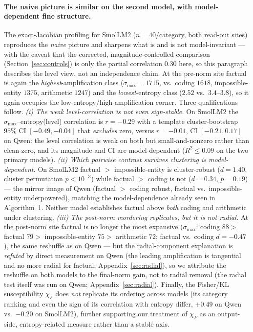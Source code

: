 \documentclass{article}
\begin{document}
\paragraph{The naive picture is similar on the second model, with model-dependent fine structure.}
The exact-Jacobian profiling for SmolLM2 ($n=40$/category, both read-out sites) reproduces the
\emph{naive} picture and sharpens what is and is not model-invariant --- with the caveat that the
corrected, magnitude-controlled comparison (Section~\ref{sec:controls}) is only the partial
correlation $0.30$ here, so this paragraph describes the level view, not an independence claim. At the
pre-norm site factual is again the \emph{highest}-amplification class ($\sigma_{\max}=1715$, vs.\
coding $1618$, impossible-entity $1375$, arithmetic $1247$) and the \emph{lowest}-entropy class
($2.52$ vs.\ $3.4$--$3.8$), so it again occupies the low-entropy/high-amplification corner. Three
qualifications follow. \emph{(i) The weak level-correlation is not even sign-stable.} On
SmolLM2 the $\sigma_{\max}$--entropy(level) correlation is $r=-0.29$ with a template cluster-bootstrap
$95\%$ CI $[-0.49,-0.04]$ that \emph{excludes} zero, versus $r=-0.01$, CI $[-0.21,0.17]$ on Qwen: the
level correlation is weak on both but small-and-nonzero rather than clean-zero, and its magnitude and
CI are model-dependent ($R^2\le0.09$ on the two primary models). \emph{(ii) Which pairwise contrast survives
clustering is model-dependent.} On SmolLM2 factual $>$ impossible-entity is cluster-robust
($d=1.40$, cluster permutation $p<10^{-3}$) while factual $>$ coding is not ($d=0.34$, $p=0.19$) --- the
mirror image of Qwen (factual $>$ coding robust, factual vs.\ impossible-entity underpowered),
matching the model-dependence already seen in Algorithm~1. Neither model establishes factual above
\emph{both} coding and arithmetic under clustering. \emph{(iii) The post-norm reordering replicates,
but it is not radial.} At the post-norm site factual is no longer the most expansive ($\sigma_{\max}$:
coding $88 >$ factual $79 >$ impossible-entity $75 >$ arithmetic $72$; factual vs.\ coding $d=-0.47$),
the same reshuffle as on Qwen --- but the radial-component explanation is \emph{refuted} by direct
measurement on Qwen (the leading amplification is tangential and no more radial for factual;
Appendix~\ref{sec:radial}), so we attribute the reshuffle on both models to the final-norm gain, not
to radial removal (the radial test itself was run on Qwen; Appendix~\ref{sec:radial}). Finally, the Fisher/KL susceptibility $\chi_F$ does
\emph{not} replicate its ordering across models (its category ranking and even the sign of its
correlation with entropy differ, $+0.49$ on Qwen vs.\ $-0.20$ on SmolLM2), further supporting our
treatment of $\chi_F$ as an output-side, entropy-related measure rather than a stable axis.
\end{document}
